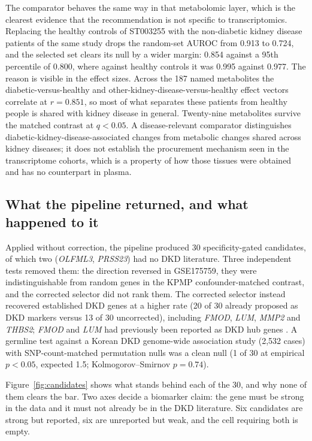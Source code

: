 \documentclass[11pt]{article}
\begin{document}
The comparator behaves the same way in that metabolomic layer, which is the clearest
evidence that the recommendation is not specific to transcriptomics. Replacing the healthy
controls of ST003255 with the non-diabetic kidney disease patients of the same study drops the
random-set AUROC from 0.913 to 0.724, and the selected set clears its null by a wider
margin: 0.854 against a 95th percentile of 0.800, where against healthy controls it was
0.995 against 0.977. The reason is visible in the effect sizes. Across the 187 named metabolites the
diabetic-versus-healthy and other-kidney-disease-versus-healthy effect vectors correlate at
$r = 0.851$, so most of what separates these patients from healthy people is shared with kidney
disease in general. Twenty-nine metabolites survive the matched contrast at $q < 0.05$. A
disease-relevant comparator distinguishes diabetic-kidney-disease-associated changes from
metabolic changes shared across kidney diseases; it does not establish the procurement
mechanism seen in the transcriptome cohorts, which is a property of how those tissues
were obtained and has no counterpart in plasma.


\label{note:S7}
\subsection{What the pipeline returned, and what happened to it}\label{sec:candidates}

Applied without correction, the pipeline produced 30 specificity-gated candidates, of which two
(\textit{OLFML3}, \textit{PRSS23}) had no DKD literature. Three independent tests removed them:
the direction reversed in GSE175759, they were indistinguishable from random genes in the KPMP
confounder-matched contrast, and the corrected selector did not rank them. The corrected selector
instead recovered established DKD genes at a higher rate (20 of 30 already proposed as DKD markers
versus 13 of 30 uncorrected), including \textit{FMOD}, \textit{LUM}, \textit{MMP2} and
\textit{THBS2}; \textit{FMOD} and \textit{LUM} had previously been reported as
DKD hub genes \cite{feng2021}. A germline test against a Korean DKD genome-wide association study
(2,532 cases) with SNP-count-matched permutation nulls was a clean null (1 of 30 at empirical
$p < 0.05$, expected 1.5; Kolmogorov--Smirnov $p = 0.74$).

Figure~\ref{fig:candidates} shows what stands behind each of the 30, and why none
of them clears the bar. Two axes decide a biomarker claim: the gene must be strong in the data
and it must not already be in the DKD literature. Six candidates are strong but reported, six are
unreported but weak, and the cell requiring both is empty.
\end{document}
